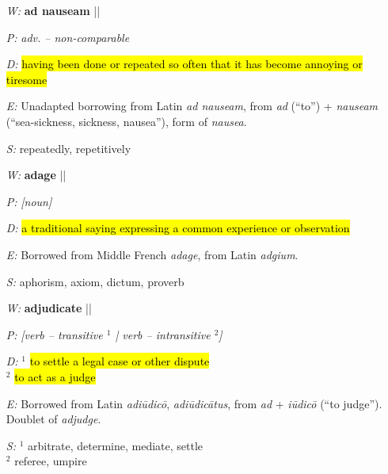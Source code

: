 \documentclass[11pt, table, dvipsnames, svgnames, x11names, xcdraw, titlepage]{article}
\begin{document}
\null

\begin{itemize}[itemsep=0pt, topsep=0pt]
\item[\textit{W:}] \textbf{ad nauseam} \quad || \quad {}
\item[\textit{P:}] \textit{adv. – non-comparable}
\item[\textit{D:}] \hl{having been done or repeated so often that it has become annoying or tiresome}
\item[\textit{E:}] Unadapted borrowing from Latin \textit{ad nauseam}, from \textit{ad} (``to”) + \textit{nauseam} (``sea-sickness, sickness, nausea”), form of \textit{nausea}.
\item[\textit{S:}] repeatedly, repetitively
\end{itemize}

\null

\begin{itemize}[itemsep=0pt, topsep=0pt]
\item[\textit{W:}] \textbf{adage} \quad || \quad {}
\item[\textit{P:}] \textit{[noun]}
\item[\textit{D:}] \hl{a traditional saying expressing a common experience or observation}
\item[\textit{E:}] Borrowed from Middle French \textit{adage}, from Latin \textit{adgium}.
\item[\textit{S:}] aphorism, axiom, dictum, proverb
\end{itemize}

\null

\begin{itemize}[itemsep=0pt, topsep=0pt]
\item[\textit{W:}] \textbf{adjudicate} \quad || \quad {}
\item[\textit{P:}] \textit{[verb – transitive $^1$ {|} verb – intransitive $^2$]}
\item[\textit{D:}] $^1$ \hl{to settle a legal case or other dispute} \\
$^2$ \hl{to act as a judge}
\item[\textit{E:}] Borrowed from Latin \textit{adi\={u}dic\={o}}, \textit{adi\={u}dic\={a}tus}, from \textit{ad} + \textit{i\={u}dic\={o}} (``to judge''). Doublet of \textit{adjudge}.
\item[\textit{S:}] $^1$ arbitrate, determine, mediate, settle \\
$^2$ referee, umpire
\end{itemize}
\end{document}
